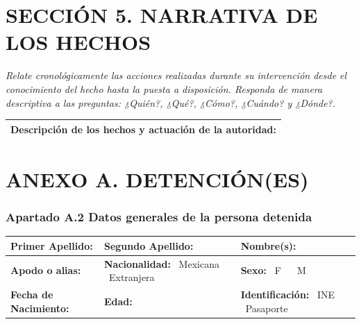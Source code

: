 \documentclass[10pt,letterpaper]{article}
\newcommand{\casilla}{\text{\Large$\square$}}
\begin{document}
\vspace{0.8cm}

\section*{SECCIÓN 5. NARRATIVA DE LOS HECHOS}
\textit{Relate cronológicamente las acciones realizadas durante su intervención desde el conocimiento del hecho hasta la puesta a disposición. Responda de manera descriptiva a las preguntas: ¿Quién?, ¿Qué?, ¿Cómo?, ¿Cuándo? y ¿Dónde?.}

\vspace{0.4cm}
\begin{tabularx}{\textwidth}{|X|}
\hline
\textbf{Descripción de los hechos y actuación de la autoridad:} \\[10cm]
\hline
\end{tabularx}

\vspace{0.8cm}
\pagebreak

\section*{ANEXO A. DETENCIÓN(ES)}
\subsubsection*{Apartado A.2 Datos generales de la persona detenida}

\begin{tabularx}{\textwidth}{|X|X|X|}
\hline
\textbf{Primer Apellido:} & \textbf{Segundo Apellido:} & \textbf{Nombre(s):} \\ \hline
\textbf{Apodo o alias:} & \textbf{Nacionalidad:} \casilla~Mexicana ~ \casilla~Extranjera & \textbf{Sexo:} \casilla~F ~ \casilla~M \\ \hline
\textbf{Fecha de Nacimiento:} & \textbf{Edad:} & \textbf{Identificación:} \casilla~INE \casilla~Pasaporte \\ \hline
\end{tabularx}

\vspace{0.6cm}
\end{document}
